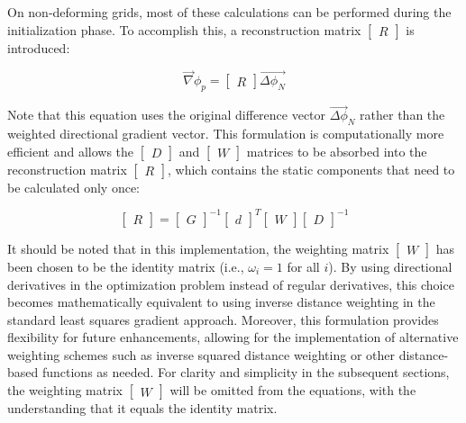\noindent On non-deforming grids, most of these calculations can be performed during the initialization phase. To accomplish this, a reconstruction matrix $\begin{bmatrix}R\end{bmatrix}$ is introduced:

\begin{equation}
  \vec{\nabla}\phi_p=\begin{bmatrix}R\end{bmatrix}\vec{\Delta\phi_N}
  \label{eqn:soln-in-terms-of-R}
\end{equation}

\noindent Note that this equation uses the original difference vector $\vec{\Delta\phi}_N$ rather than the weighted directional gradient vector. This formulation is computationally more efficient and allows the $\begin{bmatrix}D\end{bmatrix}$  and  $\begin{bmatrix}W\end{bmatrix}$ matrices to be absorbed into the reconstruction matrix $\begin{bmatrix}R\end{bmatrix}$, which contains the static components that need to be calculated only once:

\begin{equation}
  \begin{bmatrix}R\end{bmatrix}= \begin{bmatrix}G\end{bmatrix}^{-1}\begin{bmatrix}d\end{bmatrix}^{T} \begin{bmatrix}W\end{bmatrix}\begin{bmatrix}D\end{bmatrix}^{-1}
  \label{eqn:R-for-invertible-G}
\end{equation}

It should be noted that in this implementation, the weighting matrix $\begin{bmatrix}W\end{bmatrix}$ has been chosen to be the identity matrix (i.e., $\omega_i = 1$ for all $i$). 
By using directional derivatives in the optimization problem instead of regular derivatives, this choice becomes mathematically equivalent to using inverse distance weighting in the standard least squares gradient approach.
Moreover, this formulation provides flexibility for future enhancements, allowing for the implementation of alternative weighting schemes such as inverse squared distance weighting or other distance-based functions as needed.
For clarity and simplicity in the subsequent sections, the weighting matrix $\begin{bmatrix}W\end{bmatrix}$ will be omitted from the equations, with the understanding that it equals the identity matrix.

